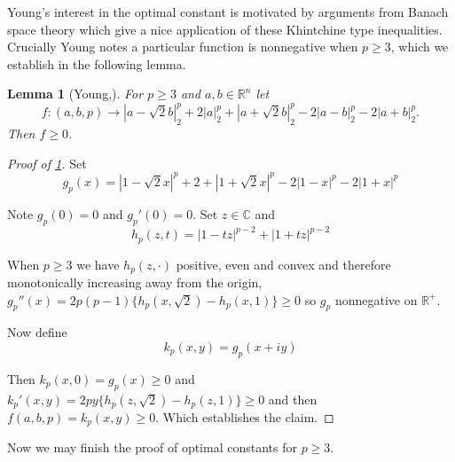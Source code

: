 \documentclass[10pt]{article}
\newcommand{\1}{\textbf{1}}
\newcommand{\R}{\mathbb{R}}
\newcommand{\C}{\mathbb{C}}
\newcommand{\normOne}[1]{\left\lvert#1\right\rvert}
\newtheorem{lemma}[theorem]{Lemma}
\theoremstyle{remark}
\theoremstyle{definition}
\begin{document}
Young's interest in the optimal constant is motivated by arguments from Banach space theory which give a nice application of these Khintchine type inequalities. Crucially Young notes a particular function is nonnegative when $p \geq 3$, which we establish in the following lemma.

\begin{lemma}[Young,\cite{Y}]\label{lem:RS1}
	For $p \geq 3$ and $a,b \in \R^n$ let
	\begin{equation*}
		f : (a,b,p) \to \normOne{a-\sqrt{2}b}_2^p + 2 \normOne{a}_2^p + \normOne{a+\sqrt{2}b}_2^p - 2 \normOne{a-b}_2^p - 2\normOne{a+b}_2^p.
	\end{equation*} Then $f \geq 0$.
\end{lemma}

\begin{proof}[Proof of \ref{lem:RS1}]

Set 
\begin{equation*}
	g_p(x) = \normOne{1-\sqrt{2}x}^p + 2 + \normOne{1+\sqrt{2}x}^p-2\normOne{1-x}^p-2\normOne{1+x}^p
\end{equation*}

Note $g_p(0) = 0$ and $g_p'(0) = 0$. Set $z \in \C$ and 
\begin{equation*}
	h_p(z,t) = \normOne{1-tz}^{p-2}+\normOne{1+tz}^{p-2}
\end{equation*}

When $p \geq 3$ we have $h_p(z,\cdot)$ positive, even and convex and therefore monotonically increasing away from the origin, $g_p''(x) = 2p(p-1)\{h_p(x,\sqrt{2})-h_p(x,1)\} \geq 0$ so $g_p$ nonnegative on $\R^+$. 

Now define 
\begin{equation*}
	k_p(x,y) = g_p(x+iy)
\end{equation*}

Then $k_p(x,0) = g_p(x) \geq 0$ and $k_p'(x,y) = 2py\{h_p(z,\sqrt{2})-h_p(z,1)\} \geq 0$ and then $f(a,b,p) = k_p(x,y) \geq 0$. Which establishes the claim.
\end{proof}

Now we may finish the proof of optimal constants for $p \geq 3$. 
\end{document}
